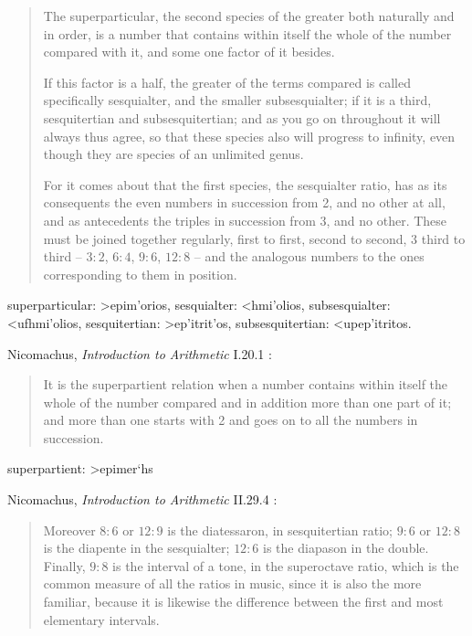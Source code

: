 \documentclass{article}
\newcommand{\textgreek}[1]{\begingroup\fontencoding{LGR}\selectfont#1\endgroup}
\theoremstyle{definition}
\begin{document}
\begin{quote}
The superparticular, the second species of the greater both naturally
and in order, is a number that contains within itself the whole of the
number compared with it, and some one factor of it besides. 

If this factor is a half, the greater of the terms compared is called
specifically sesquialter, and the smaller subsesquialter; if it is a
third, sesquitertian and subsesquitertian; and as you go on throughout
it will always thus agree, so that these species also will progress to
infinity, even though they are species of an unlimited genus. 

For it comes about that the first species, the sesquialter ratio, has as
its consequents the even numbers in succession from 2, and no other at
all, and as antecedents the triples in succession from 3, and no other.
These must be joined together regularly, first to first, second to second, 3
third to third -- $3:2$, $6:4$, $9:6$, $12:8$ -- and the analogous numbers to
the ones corresponding to them in position. 
\end{quote}

superparticular: \textgreek{>epim'orios}, 
sesquialter: \textgreek{<hmi'olios},
subsesquialter: \textgreek{<ufhmi'olios},
sesquitertian: \textgreek{>ep'itrit'os},
subsesquitertian: \textgreek{<upep'itritos}.

Nicomachus, {\em Introduction to Arithmetic} I.20.1 \cite[p.~220]{nicomachus}:

\begin{quote}
It is the superpartient relation when a number contains within
itself the whole of the number compared and in addition more than
one part of it; and more than one starts with 2 and goes on to all
the numbers in succession.
\end{quote}

superpartient: \textgreek{>epimer`hs}

Nicomachus, {\em Introduction to Arithmetic} II.29.4 \cite[p.~286]{nicomachus}:

\begin{quote}
Moreover $8 : 6$ or $12 : 9$ is the diatessaron, in sesquitertian ratio; $9 : 6$
or $12 : 8$ is the diapente in the sesquialter; $12 : 6$ is the diapason in the
double. Finally, $9 : 8$ is the interval of a tone, in the superoctave
ratio, which is the common measure of all the ratios in music, since it
is also the more familiar, because it is likewise the difference between
the first and most elementary intervals. 
\end{quote}
\end{document}
